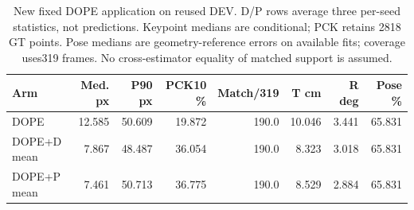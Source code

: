 \begin{table}[t]\centering\small
\caption{New fixed DOPE application on reused DEV. D/P rows average three per-seed statistics, not predictions. Keypoint medians are conditional; PCK retains 2818 GT points. Pose medians are geometry-reference errors on available fits; coverage uses319 frames. No cross-estimator equality of matched support is assumed.}\label{tab:dope}
\begin{tabular}{lrrrrrrr}\toprule
Arm & Med. px & P90 px & PCK10 \% & Match/319 & T cm & R deg & Pose \%\\\midrule
DOPE & 12.585 & 50.609 & 19.872 & 190.0 & 10.046 & 3.441 & 65.831\\
DOPE+D mean & 7.867 & 48.487 & 36.054 & 190.0 & 8.323 & 3.018 & 65.831\\
DOPE+P mean & 7.461 & 50.713 & 36.775 & 190.0 & 8.529 & 2.884 & 65.831\\
\bottomrule\end{tabular}
\end{table}
